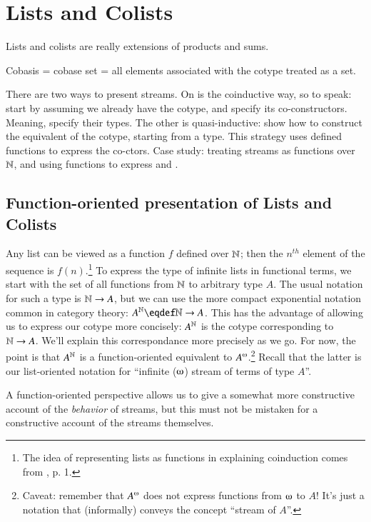 \chapter{Lists and Colists}

Lists and colists are really extensions of products and sums.

Cobasis = cobase set = all elements associated with the cotype treated
as a set.

There are two ways to present streams. On is the coinductive way, so
to speak: start by assuming we already have the cotype, and specify
its co-constructors. Meaning, specify their types. The other is
quasi-inductive: show how to construct the equivalent of the cotype,
starting from a type. This strategy uses defined functions to express
the co-ctors. Case study: treating streams as functions over \(\mathbb{N}\),
and using functions to express \cohead and \cotail.

\section{Function-oriented presentation of Lists and Colists}

Any list can be viewed as a function \(f\) defined over \(\mathbb{N}\); then
the \(n^{th}\) element of the sequence is \(f(n)\).\footnote{The idea
of representing lists as functions in explaining coinduction comes
from \cite{jacobs_intro_coalgebra}, p. 1.} To express the type of
infinite lists in functional terms, we start with the set of all
functions from \(\mathbb{N}\) to arbitrary type \(A\). The usual notation
for such a type is \(\mathbb{N}\rightarrow{}A\), but we can use the more
compact exponential notation common in category theory:
\(\exp{A}{\Nat}\defeq\Nat\rightarrow A\). This has the advantage of
allowing us to express our cotype more concisely: \(A^{\mathbb{N}}\) is
the cotype corresponding to \(\mathbb{N}\rightarrow{}A\). We'll explain this
correspondance more precisely as we go. For now, the point is that
\(A^{\mathbb{N}}\) is a function-oriented equivalent to
\(\colist{A}\).\footnote{Caveat: remember that \(\colist{A}\) does not
express functions from \(\omegaup\) to \(A\)! It's just a notation
that (informally) conveys the concept ``stream of \(A\)''.} Recall
that the latter is our list-oriented notation for ``infinite
(\(\omegaup\)) stream of terms of type \(A\)''.

A function-oriented perspective allows us to give a somewhat more
constructive account of the \textit{behavior} of streams, but this
must not be mistaken for a constructive account of the streams
themselves.

